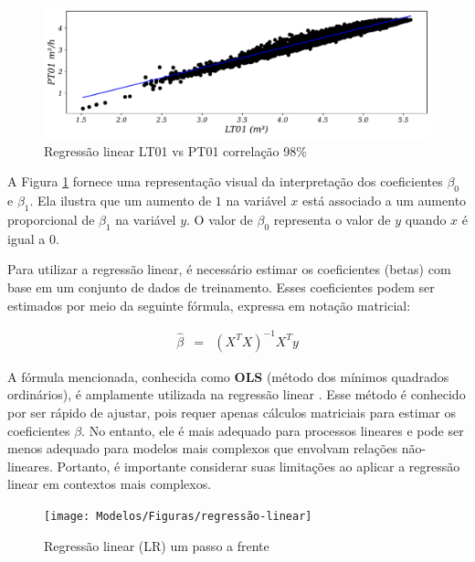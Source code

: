 \begin{figure}[!htb]
	\centering
	\caption{Regressão linear LT01 vs PT01 correlação 98\%}
	\label{fig:lr-lt01-m3}
	\includegraphics[width=0.82\linewidth]{"Modelos/Figuras/LR LT01 (m³)"}
	
\end{figure}



A Figura \ref{fig:lr-lt01-m3} fornece uma representação visual da interpretação dos coeficientes $\beta_0$ e $\beta_1$. Ela ilustra que um aumento de $1$ na variável $x$ está associado a um aumento proporcional de $\beta_1$ na variável $y$. O valor de $\beta_0$ representa o valor de $y$ quando $x$ é igual a $0$.

Para utilizar a regressão linear, é necessário estimar os coeficientes (betas) com base em um conjunto de dados de treinamento. Esses coeficientes podem ser estimados por meio da seguinte fórmula, expressa em notação matricial:

\begin{eqnarray}
	\hat{\beta}&=&\left(X^T X\right)^{-1} X^T y\label{eq:ols}
\end{eqnarray}

A fórmula mencionada, conhecida como \textbf{OLS} (método dos mínimos quadrados ordinários), é amplamente utilizada na regressão linear . Esse método é conhecido por ser rápido de ajustar, pois requer apenas cálculos matriciais para estimar os coeficientes $\beta$. No entanto, ele é mais adequado para processos lineares e pode ser menos adequado para modelos mais complexos que envolvam relações não-lineares. Portanto, é importante considerar suas limitações ao aplicar a regressão linear em contextos mais complexos.

\begin{figure}[!htb]
	\centering
	\caption{Regressão linear (LR) um passo a frente}
	\label{fig:1-regressao-linear}
	\texttt{[image: Modelos/Figuras/regressão-linear]}
	
\end{figure}

